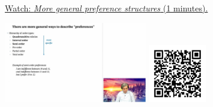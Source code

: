 
\begin{minipage}{10cm}
    \href{https://act4e-spring21.netlify.app/videos/spring2021-tradeoffs:tradeoffs:orders:general-pref.html}{Watch: \emph{More general preference structures} (1 minutes).}
        
    \href{https://act4e-spring21.netlify.app/videos/spring2021-tradeoffs:tradeoffs:orders:general-pref.html}{\includegraphics[height=3.5cm]{spring2021-tradeoffs:tradeoffs:orders:general-pref/thumbnails.jpg}}
    \href{https://act4e-spring21.netlify.app/videos/spring2021-tradeoffs:tradeoffs:orders:general-pref.html}{\includegraphics[height=2.5cm]{spring2021-tradeoffs:tradeoffs:orders:general-pref/qrcode.png}}
\end{minipage}
